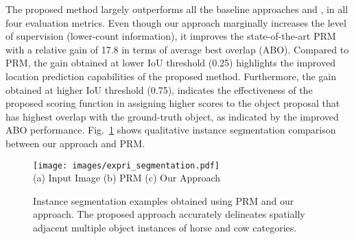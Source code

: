 \documentclass[10pt,twocolumn,letterpaper]{article}
\begin{document}
 The proposed method largely outperforms all the baseline approaches and \cite{PRM}, in all four evaluation metrics. Even though our approach marginally increases the level of supervision (lower-count information), it improves the state-of-the-art PRM with a relative gain of 17.8 in terms of average best overlap (ABO). Compared to PRM, the gain obtained at lower IoU threshold (0.25) highlights the improved location prediction capabilities of the proposed method. Furthermore, the gain obtained at higher IoU threshold (0.75), indicates the effectiveness of the proposed scoring function in assigning higher scores to the object proposal that has highest overlap with the ground-truth object, as indicated by the improved ABO performance. Fig.~\ref{fig:experi_instanceSeg} shows qualitative instance segmentation comparison between our approach and PRM. 
\begin{figure}[t]
\centering 
			\texttt{[image: images/expri\_segmentation.pdf]}\\
\hspace*{0.0\linewidth} (a) Input Image  \hspace*{0.07\linewidth} (b) PRM\cite{PRM} \hspace*{0.07\linewidth} (c) Our Approach  \\  \caption{Instance segmentation examples obtained using PRM \cite{PRM} and our approach. The proposed approach accurately delineates spatially adjacent multiple object instances of horse and cow categories.}
\label{fig:experi_instanceSeg}
\end{figure}





\begin{table}[t]
\small
 \centering
{}
\caption{Image-level supervised instance segmentation results on the PASCAL VOC 2012 val. set in terms of mean average precision (mAP\%) and Average Best Overlap(ABO). Our approach ourperforms the state-of-the-art PRM \cite{PRM} with a relative gain of 17.8 in terms of ABO.}
\label{tab:ins_seg_pascal}
\vspace{-0.0cm}
\end{table}
\end{document}

